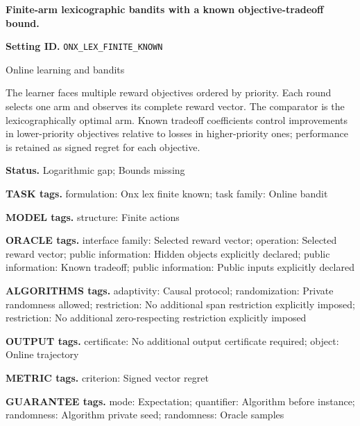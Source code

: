 \documentclass[10pt,a4paper]{article}
\begin{document}
\raggedright

{\LARGE\bfseries\sffamily\color{AtlasNavy} Finite-arm lexicographic bandits with a known objective-tradeoff bound.\par}\vspace{5pt}


\textbf{Setting ID.} \texttt{ONX\_\allowbreak{}LEX\_\allowbreak{}FINITE\_\allowbreak{}KNOWN}



Online learning and bandits



The learner faces multiple reward objectives ordered by priority. Each round selects one arm and observes its complete reward vector. The comparator is the lexicographically optimal arm. Known tradeoff coefficients control improvements in lower-priority objectives relative to losses in higher-priority ones; performance is retained as signed regret for each objective.



\textbf{Status.} Logarithmic gap; Bounds missing



\textbf{TASK tags.} formulation: Onx lex finite known; task family: Online bandit



\textbf{MODEL tags.} structure: Finite actions



\textbf{ORACLE tags.} interface family: Selected reward vector; operation: Selected reward vector; public information: Hidden objects explicitly declared; public information: Known tradeoff; public information: Public inputs explicitly declared



\textbf{ALGORITHMS tags.} adaptivity: Causal protocol; randomization: Private randomness allowed; restriction: No additional span restriction explicitly imposed; restriction: No additional zero-respecting restriction explicitly imposed



\textbf{OUTPUT tags.} certificate: No additional output certificate required; object: Online trajectory



\textbf{METRIC tags.} criterion: Signed vector regret



\textbf{GUARANTEE tags.} mode: Expectation; quantifier: Algorithm before instance; randomness: Algorithm private seed; randomness: Oracle samples
\end{document}

